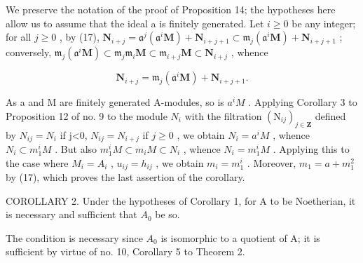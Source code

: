 We preserve the notation of the proof of Proposition 14; the hypotheses here allow us to assume that the ideal a is finitely generated. Let \(i \geqslant 0\) be any integer; for all \(j \geqslant 0\) , by (17), \(\mathbf{N}_{i+j} = \mathfrak{a}^j (\mathfrak{a}^i\mathbf{M}) + \mathbf{N}_{i+j+1} \subset \mathfrak{m}_j(\mathfrak{a}^i\mathbf{M}) + \mathbf{N}_{i+j+1}\) ; conversely, \(\mathfrak{m}_j(\mathfrak{a}^i\mathbf{M}) \subset \mathfrak{m}_j\mathfrak{m}_i\mathbf{M} \subset \mathfrak{m}_{i+j}\mathbf{M} \subset \mathbf{N}_{i+j}\) , whence

\[
\mathbf {N} _ {i + j} = \mathfrak {m} _ {j} (\mathfrak {a} ^ {i} \mathbf {M}) + \mathbf {N} _ {i + j + 1}.
\]

As a and M are finitely generated A-modules, so is \(a^{i}M\) . Applying Corollary 3 to Proposition 12 of no. 9 to the module \(N_{i}\) with the filtration \((\mathrm{N}_{ij})_{j\in\mathbf{Z}}\) defined by \(N_{ij}=N_{i}\) if j\textless0, \(N_{ij}=N_{i+j}\) if \(j\geqslant0\) , we obtain \(N_{i}=a^{i}M\) , whence \(N_{i}\subset m_{1}^{i}M\) . But also \(m_{1}^{i}M\subset m_{i}M\subset N_{i}\) , whence \(N_{i}=m_{1}^{i}M\) . Applying this to the case where \(M_{i}=A_{i}\) , \(u_{ij}=h_{ij}\) , we obtain \(m_{i}=m_{1}^{i}\) . Moreover, \(m_{1}=a+m_{1}^{2}\) by (17), which proves the last assertion of the corollary.

COROLLARY 2. Under the hypotheses of Corollary 1, for A to be Noetherian, it is necessary and sufficient that \(A_{0}\) be so.

The condition is necessary since \(A_{0}\) is isomorphic to a quotient of A; it is sufficient by virtue of no. 10, Corollary 5 to Theorem 2.

